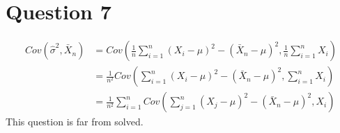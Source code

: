\documentclass[11pt]{article} %
\begin{document}
\section{Question 7}
\begin{align*}
Cov(\hat{\sigma}^2,\bar{X}_n) &= Cov\left(\frac{1}{n}\sum_{i=1}^{n}(X_i - \mu)^2- ( \bar{X}_{n} - \mu)^2,\frac{1}{n}\sum_{i=1}^{n}X_i\right) \\
&= \frac{1}{n^2}Cov\left(\sum_{i=1}^{n}(X_i - \mu)^2- ( \bar{X}_{n} - \mu)^2,\sum_{i=1}^{n}X_i\right) \\
&= \frac{1}{n^2}\sum_{i=1}^{n}Cov\left(\sum_{j=1}^{n}(X_j - \mu)^2- ( \bar{X}_{n} - \mu)^2,X_i\right) %
\end{align*}
This question is far from solved.
\end{document}
